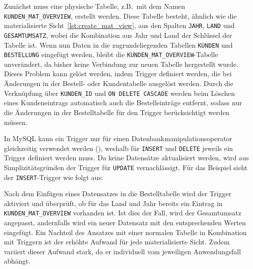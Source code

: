 Zunächst muss eine physische Tabelle, z.B.\ mit dem Namen \texttt{KUNDEN\_MAT\_OVERVIEW}, erstellt werden.
Diese Tabelle besteht, ähnlich wie die materialisierte Sicht~\ref{lst:create_mat_view}, aus den Spalten \texttt{JAHR}, \texttt{LAND} und \texttt{GESAMTUMSATZ}, wobei die Kombination aus Jahr und Land der Schlüssel der Tabelle ist.
Wenn nun Daten in die zugrundeliegenden Tabellen \texttt{KUNDEN} und \texttt{BESTELLUNG} eingefügt werden, bleibt die \texttt{KUNDEN\_MAT\_OVERVIEW}-Tabelle unverändert, da bisher keine Verbindung zur neuen Tabelle hergestellt wurde.
Dieses Problem kann gelöst werden, indem Trigger definiert werden, die bei Änderungen in der Bestell- oder Kundentabelle ausgelöst werden.
Durch die Verknüpfung über \texttt{KUNDEN\_ID} und \texttt{ON DELETE CASCADE} werden beim Löschen eines Kundeneintrags automatisch auch die Bestelleinträge entfernt, sodass nur die Änderungen in der Bestelltabelle für den Trigger berücksichtigt werden müssen.

In MySQL kann ein Trigger nur für einen Datenbankmanipulationsoperator gleichzeitig verwendet werden (\cite{mysql_trigger_syntax}), weshalb für \texttt{INSERT} und \texttt{DELETE} jeweils ein Trigger definiert werden muss.
Da keine Datensätze aktualisiert werden, wird aus Simplizitätsgründen der Trigger für \texttt{UPDATE} vernachlässigt.
Für das Beispiel sieht der \texttt{INSERT}-Trigger wie folgt aus:

\vspace{-5pt}


Nach dem Einfügen eines Datensatzes in die Bestelltabelle wird der Trigger aktiviert und überprüft, ob für das Land und Jahr bereits ein Eintrag in \texttt{KUNDEN\_MAT\_OVERVIEW} vorhanden ist.
Ist dies der Fall, wird der Gesamtumsatz angepasst, andernfalls wird ein neuer Datensatz mit den entsprechenden Werten eingefügt.
Ein Nachteil des Ansatzes mit einer normalen Tabelle in Kombination mit Triggern ist der erhöhte Aufwand für jede materialisierte Sicht.
Zudem variiert dieser Aufwand stark, da er individuell vom jeweiligen Anwendungsfall abhängt.

